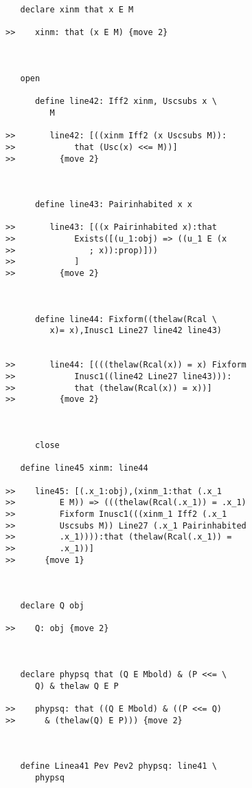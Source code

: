 \documentclass[12pt]{article}
\begin{document}
\begin{verbatim}
   declare xinm that x E M

>>    xinm: that (x E M) {move 2}



   open

      define line42: Iff2 xinm, Uscsubs x \
         M

>>       line42: [((xinm Iff2 (x Uscsubs M)):
>>            that (Usc(x) <<= M))]
>>         {move 2}



      define line43: Pairinhabited x x

>>       line43: [((x Pairinhabited x):that
>>            Exists([(u_1:obj) => ((u_1 E (x
>>               ; x)):prop)]))
>>            ]
>>         {move 2}



      define line44: Fixform((thelaw(Rcal \
         x)= x),Inusc1 Line27 line42 line43)


>>       line44: [(((thelaw(Rcal(x)) = x) Fixform
>>            Inusc1((line42 Line27 line43))):
>>            that (thelaw(Rcal(x)) = x))]
>>         {move 2}



      close

   define line45 xinm: line44

>>    line45: [(.x_1:obj),(xinm_1:that (.x_1
>>         E M)) => (((thelaw(Rcal(.x_1)) = .x_1)
>>         Fixform Inusc1(((xinm_1 Iff2 (.x_1
>>         Uscsubs M)) Line27 (.x_1 Pairinhabited
>>         .x_1)))):that (thelaw(Rcal(.x_1)) =
>>         .x_1))]
>>      {move 1}



   declare Q obj

>>    Q: obj {move 2}



   declare phypsq that (Q E Mbold) & (P <<= \
      Q) & thelaw Q E P

>>    phypsq: that ((Q E Mbold) & ((P <<= Q)
>>      & (thelaw(Q) E P))) {move 2}



   define Linea41 Pev Pev2 phypsq: line41 \
      phypsq


\end{verbatim}
\end{document}
